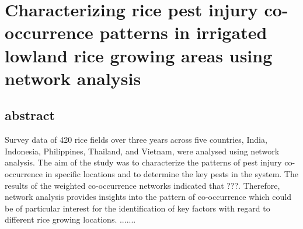 \section{Characterizing rice pest injury co-occurrence patterns in irrigated lowland rice growing areas using network analysis}


\subsection{abstract}
Survey data of 420 rice fields over three years across five countries, India, Indonesia, Philippines, Thailand, and Vietnam, were analysed using network analysis. The aim of the study was to characterize the patterns of pest injury co-occurrence in specific locations and to determine the key pests in the system. The results of the weighted co-occurrence networks indicated that ???. Therefore, network analysis provides insights into the pattern of co-occurrence  which could be of particular interest for the identification of key factors with regard to different rice growing locations. .......
